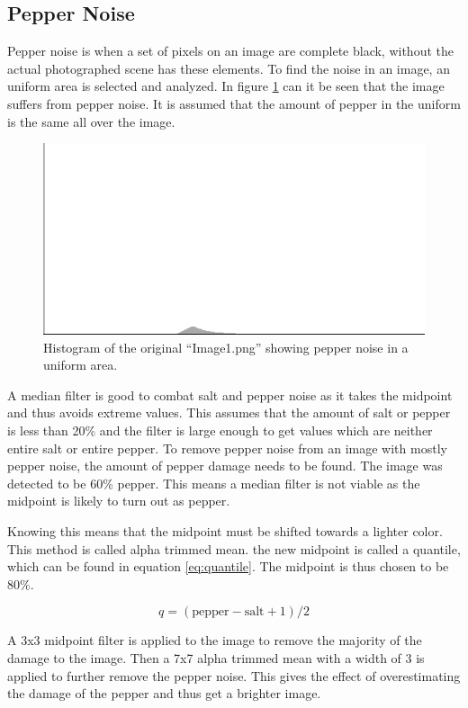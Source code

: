 \subsection{Pepper Noise}\label{image_1}
Pepper noise is when a set of pixels on an image are complete black, without the actual photographed scene has these elements.
To find the noise in an image, an uniform area is selected and analyzed.
In figure \ref{fig:hist_pepper} can it be seen that the image suffers from pepper noise.
It is assumed that the amount of pepper in the uniform is the same all over the image.

\begin{figure}[H]
\centering
\includegraphics[width = 0.8 \linewidth]{graphics/hist1_uniform.png}
\caption{Histogram of the original ``Image1.png'' showing pepper noise in a uniform area.}
\label{fig:hist_pepper}
\end{figure}

A median filter is good to combat salt and pepper noise as it takes the midpoint and thus avoids extreme values.
This assumes that the amount of salt or pepper is less than 20\% and the filter is large enough to get values which are neither entire salt or entire pepper.
To remove pepper noise from an image with mostly pepper noise, the amount of pepper damage needs to be found.
The image was detected to be 60\% pepper.
This means a median filter is not viable as the midpoint is likely to turn out as pepper.

Knowing this means that the midpoint must be shifted towards a lighter color.
This method is called alpha trimmed mean.
the new midpoint is called a quantile, which can be found in equation \ref{eq:quantile}.
The midpoint is thus chosen to be 80\%. 

\begin{equation}
 q = (\text{pepper}-\text{salt}+1)/2 \label{eq:quantile}
\end{equation}

A 3x3 midpoint filter is applied to the image to remove the majority of the damage to the image.
Then a 7x7 alpha trimmed mean with a width of 3 is applied to further remove the pepper noise.
This gives the effect of overestimating the damage of the pepper and thus get a brighter image.

